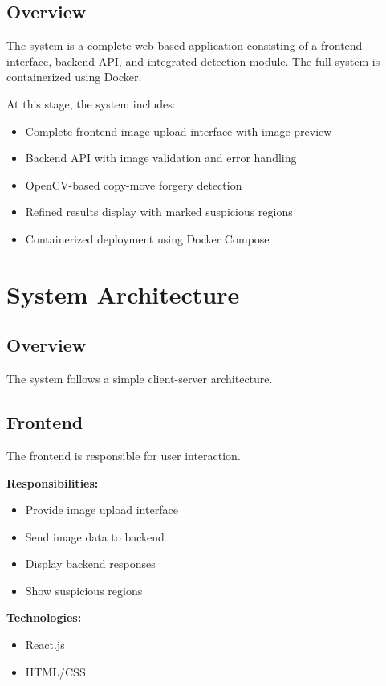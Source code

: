 \documentclass[12pt]{article}
\begin{document}
\subsection{Overview}

The system is a complete web-based application consisting of a frontend interface, backend API, and integrated detection module. The full system is containerized using Docker.

At this stage, the system includes:
\begin{itemize}[noitemsep]
    \item Complete frontend image upload interface with image preview
    \item Backend API with image validation and error handling
    \item OpenCV-based copy-move forgery detection
    \item Refined results display with marked suspicious regions
    \item Containerized deployment using Docker Compose
\end{itemize}

\section{System Architecture}

\subsection{Overview}

The system follows a simple client-server architecture.

\subsection{Frontend}

The frontend is responsible for user interaction.

\textbf{Responsibilities:}
\begin{itemize}[noitemsep]
    \item Provide image upload interface
    \item Send image data to backend
    \item Display backend responses
    \item Show suspicious regions
\end{itemize}

\textbf{Technologies:}
\begin{itemize}[noitemsep]
    \item React.js
    \item HTML/CSS
\end{itemize}
\end{document}
